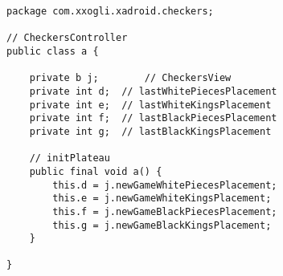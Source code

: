 \begin{lstlisting}[caption=a.java (CheckersController.java), label=lstPlacementA]
package com.xxogli.xadroid.checkers;

// CheckersController
public class a {

	private b j;		// CheckersView
	private int d;	// lastWhitePiecesPlacement
	private int e;	// lastWhiteKingsPlacement
	private int f;	// lastBlackPiecesPlacement
	private int g;	// lastBlackKingsPlacement

	// initPlateau
	public final void a() {
		this.d = j.newGameWhitePiecesPlacement;
		this.e = j.newGameWhiteKingsPlacement;
		this.f = j.newGameBlackPiecesPlacement;
		this.g = j.newGameBlackKingsPlacement;
	}

}
\end{lstlisting}